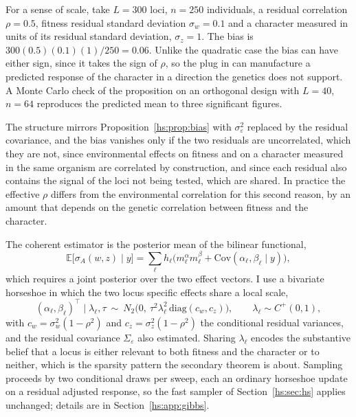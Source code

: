 For a sense of scale, take $L = 300$ loci, $n = 250$ individuals, a residual correlation $\rho = 0.5$, fitness residual standard deviation $\sigma_w = 0.1$ and a character measured in units of its residual standard deviation, $\sigma_z = 1$. The bias is $300(0.5)(0.1)(1)/250 = 0.06$. Unlike the quadratic case the bias can have either sign, since it takes the sign of $\rho$, so the plug in can manufacture a predicted response of the character in a direction the genetics does not support. A Monte Carlo check of the proposition on an orthogonal design with $L = 40$, $n = 64$ reproduces the predicted mean to three significant figures.

The structure mirrors Proposition~\ref{hs:prop:bias} with $\sigma^2_\varepsilon$ replaced by the residual covariance, and the bias vanishes only if the two residuals are uncorrelated, which they are not, since environmental effects on fitness and on a character measured in the same organism are correlated by construction, and since each residual also contains the signal of the loci not being tested, which are shared. In practice the effective $\rho$ differs from the environmental correlation for this second reason, by an amount that depends on the genetic correlation between fitness and the character.

The coherent estimator is the posterior mean of the bilinear functional,
\begin{equation}
\mathbb{E}\big[\sigma_A(w,z)\mid y\big] = \sum_\ell h_\ell\Big(m^\alpha_\ell m^\beta_\ell + \mathrm{Cov}(\alpha_\ell,\beta_\ell\mid y)\Big),
\label{hs:eq:bilinear}
\end{equation}
which requires a joint posterior over the two effect vectors. I use a bivariate horseshoe in which the two locus specific effects share a local scale,
\[
(\alpha_\ell,\beta_\ell)^\top \mid \lambda_\ell,\tau \ \sim\ N_2\big(0,\ \tau^2\lambda_\ell^2\,\mathrm{diag}(c_w,c_z)\big),
\qquad \lambda_\ell \sim C^{+}(0,1),
\]
with $c_w = \sigma_w^2(1-\rho^2)$ and $c_z = \sigma_z^2(1-\rho^2)$ the conditional residual variances, and the residual covariance $\Sigma_\varepsilon$ also estimated. Sharing $\lambda_\ell$ encodes the substantive belief that a locus is either relevant to both fitness and the character or to neither, which is the sparsity pattern the secondary theorem is about. Sampling proceeds by two conditional draws per sweep, each an ordinary horseshoe update on a residual adjusted response, so the fast sampler of Section~\ref{hs:sec:hs} applies unchanged; details are in Section~\ref{hs:app:gibbs}.


